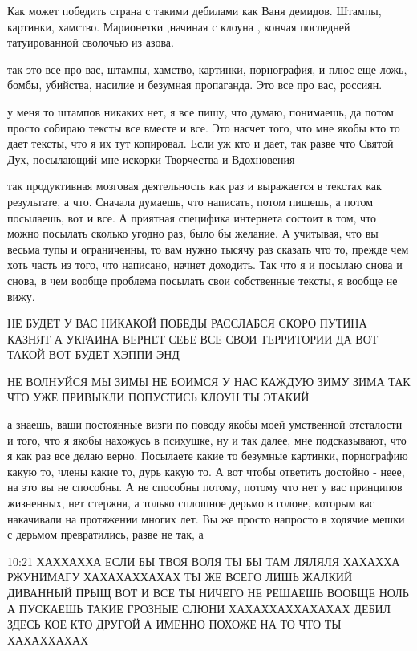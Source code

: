 
Как может победить страна с такими дебилами как Ваня демидов. Штампы, картинки,
хамство. Марионетки ,начиная с клоуна , кончая последней татуированной сволочью
из азова.

так это все про вас, штампы, хамство, картинки, порнография, и плюс еще ложь,
бомбы, убийства, насилие и безумная пропаганда. Это все про вас, россиян.

у меня то штампов никаких нет, я все пишу, что думаю, понимаешь, да потом
просто собираю тексты все вместе и все. Это насчет того, что мне якобы кто то
дает тексты, что я их тут копировал. Если уж кто и дает, так разве что Святой
Дух, посылающий мне искорки Творчества и Вдохновения

так продуктивная мозговая деятельность как раз и выражается в текстах как
результате, а что. Сначала думаешь, что написать, потом пишешь, а потом
посылаешь, вот и все. А приятная специфика интернета состоит в том, что можно
посылать сколько угодно раз, было бы желание. А учитывая, что вы весьма тупы и
ограниченны, то вам нужно тысячу раз сказать что то, прежде чем хоть часть из
того, что написано, начнет доходить. Так что я и посылаю снова и снова, в чем
вообще проблема посылать свои собственные тексты, я вообще не вижу.

НЕ БУДЕТ У ВАС НИКАКОЙ ПОБЕДЫ РАССЛАБСЯ СКОРО ПУТИНА КАЗНЯТ А УКРАИНА ВЕРНЕТ
СЕБЕ ВСЕ СВОИ ТЕРРИТОРИИ ДА ВОТ ТАКОЙ ВОТ БУДЕТ ХЭППИ ЭНД

НЕ ВОЛНУЙСЯ МЫ ЗИМЫ НЕ БОИМСЯ У НАС КАЖДУЮ ЗИМУ ЗИМА ТАК ЧТО УЖЕ ПРИВЫКЛИ
ПОПУСТИСЬ КЛОУН ТЫ ЭТАКИЙ

а знаешь, ваши постоянные визги по поводу якобы моей умственной отсталости и
того, что я якобы нахожусь в психушке, ну и так далее, мне подсказывают, что я
как раз все делаю верно. Посылаете какие то безумные картинки, порнографию
какую то, члены какие то, дурь какую то. А вот чтобы ответить достойно - неее,
на это вы не способны. А не способны потому, потому что нет у вас принципов
жизненных, нет стержня, а только сплошное дерьмо в голове, которым вас
накачивали на протяжении многих лет. Вы же просто напросто в ходячие мешки с
дерьмом превратились, разве не так, а

10:21
ХАХХАХХА ЕСЛИ БЫ ТВОЯ ВОЛЯ ТЫ БЫ ТАМ ЛЯЛЯЛЯ ХАХАХХА РЖУНИМАГУ ХАХАХАХХАХАХ ТЫ
ЖЕ ВСЕГО ЛИШЬ ЖАЛКИЙ ДИВАННЫЙ ПРЫЩ ВОТ И ВСЕ ТЫ НИЧЕГО НЕ РЕШАЕШЬ ВООБЩЕ НОЛЬ А
ПУСКАЕШЬ ТАКИЕ ГРОЗНЫЕ СЛЮНИ ХАХАХХАХХАХАХАХ ДЕБИЛ ЗДЕСЬ КОЕ КТО ДРУГОЙ А
ИМЕННО ПОХОЖЕ НА ТО ЧТО ТЫ ХАХАХХАХАХ

